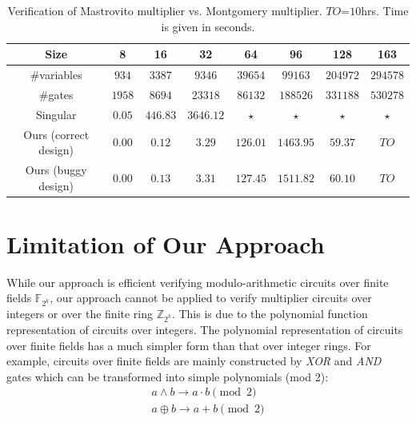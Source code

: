 \begin{table}[b]
\begin{center}
\caption{Verification of Mastrovito multiplier vs. Montgomery
  multiplier. $TO$=$10$hrs. Time is given in seconds.} 
\label{tab:masvsmont}
\begin{tabular}{|c||c|c|c|c|c|c|c|} \hline 
Size   			&8  		&16       	&32       	&64       	&96      	&128		&163	\\
\hline 
\#variables 	&$934$ 		&$3387$ 	&$9346$ 	&$39654$ 	&$99163$ 	&$204972$ 	&$294578$ 	\\
\hline 
\#gates 		&$1958$  	&$8694$    	&$23318$   	&$86132$   	&$188526$ 	&$331188$ 	&$530278$ \\
\hline
Singular		&$0.05$  	&$446.83$   &$3646.12$  &$\star$   	&$\star$ 	&$\star$ 	&$\star$	\\
\hline
Ours (correct design)	&$0.00$  	&$0.12$   	&$3.29$  	&$126.01$  &$1463.95$  &$59.37$		&$TO$ \\
\hline{}
Ours (buggy design)		&$0.00$  	&$0.13$   	&$3.31$  	&$127.45$  &$1511.82$  &$60.10$		&$TO$ \\
\hline
\end{tabular}
\end{center}
\vspace{-0.2in}
\end{table}

\section{Limitation of Our Approach}
While our approach is efficient verifying modulo-arithmetic circuits
over finite fields $\mathbb{F}_{2^{k}}$, our approach cannot be
applied to verify multiplier circuits over integers or over the finite
ring $\mathbb{Z}_{2^{k}}$. This is due to the polynomial
function representation of circuits over integers. The polynomial
representation of circuits over finite fields has a much simpler form
than that over integer rings. For example, circuits over finite
fields are mainly constructed by {\it XOR} and {\it AND} gates which
can be transformed into simple polynomials (mod 2): 
\begin{eqnarray}
a \wedge b \rightarrow a\cdot b \pmod 2  \nonumber \\ 
a \oplus b \rightarrow a+b \pmod 2  \nonumber 
\end{eqnarray}

